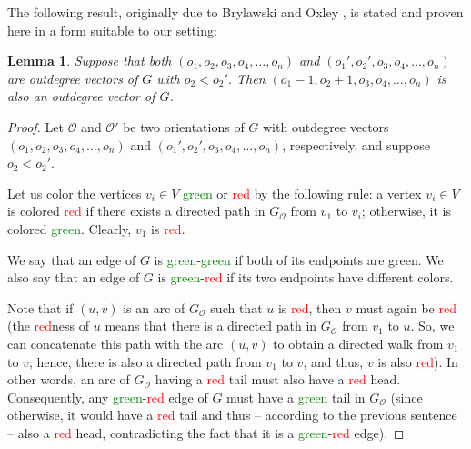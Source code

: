 \documentclass[12pt]{article}
\newtheorem{lemma}[theorem]{Lemma}
\theoremstyle{definition}
\theoremstyle{remark}
\newcommand{\Green}[1]{\textcolor{Green}{#1}}
\newcommand{\Red}[1]{\textcolor{Red}{#1}}
\begin{document}
The following result, originally due to Brylawski and Oxley \cite[Lemma~6.3.20]{BrylawskiOxley1992}, is stated and proven here in a form suitable to our setting:

\begin{lemma}\label{outdeg}
    Suppose that both $(o_1,o_2,o_3,o_4,\ldots,o_n)$ and $(o_1',o_2',o_3,o_4,\ldots,o_n)$ are outdegree vectors of $G$ with $o_2 < o_2'$.
    Then $(o_1-1,o_2+1,o_3,o_4,\ldots,o_n)$ is also an outdegree vector of $G$.
\end{lemma}

\begin{proof}
    Let $\mathcal{O}$ and $\mathcal{O}'$ be two orientations of $G$ with outdegree vectors $(o_1,o_2,o_3,o_4,\ldots,o_n)$ and $(o_1',o_2',o_3,o_4,\ldots,o_n)$, respectively, and suppose $o_2 < o_2'$.

    Let us color the vertices $v_i \in V$ \Green{green} or \Red{red} by the following rule: a vertex $v_i \in V$ is colored \Red{red} if there exists a directed path in $G_{\mathcal{O}}$ from $v_1$ to $v_i$; otherwise, it is colored \Green{green}.
	Clearly, $v_1$ is \Red{red}.

	We say that an edge of $G$ is \Green{green}-\Green{green} if both of its endpoints are green.
	We also say that an edge of $G$ is \Green{green}-\Red{red} if its two endpoints have different colors.
	
	Note that if $(u, v)$ is an arc of $G_{\mathcal{O}}$ such that $u$ is \Red{red}, then $v$ must again be \Red{red} (the \Red{red}ness of $u$ means that there is a directed path in $G_{\mathcal{O}}$ from $v_1$ to $u$. So, we can concatenate this path with the arc $(u, v)$ to obtain a directed walk from $v_1$ to $v$; hence, there is also a directed path from $v_1$ to $v$, and thus, $v$ is also \Red{red}).
	In other words, an arc of $G_{\mathcal{O}}$ having a \Red{red} tail must also have a \Red{red} head.
	Consequently, any \Green{green}-\Red{red} edge of $G$ must have a \Green{green} tail in $G_{\mathcal{O}}$ (since otherwise, it would have a \Red{red} tail and thus -- according to the previous sentence -- also a \Red{red} head, contradicting the fact that it is a \Green{green}-\Red{red} edge).
    

\end{proof}
\end{document}
